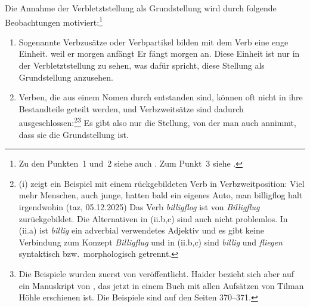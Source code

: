 Die Annahme der Verbletztstellung\label{page-verbletzt} als Grundstellung wird durch folgende Beobachtungen
motiviert:\footnote{
  Zu den Punkten~1 und~2 siehe auch . Zum Punkt~3 siehe .%
}
\begin{enumerate}
\item Sogenannte Verbzusätze oder Verbpartikel bilden mit dem Verb eine enge Einheit.
\eal
\ex weil er morgen anfängt
\ex Er fängt morgen an.
\zl
Diese Einheit ist nur in der Verbletztstellung zu sehen, was dafür spricht, diese
Stellung als Grundstellung anzusehen. 

\item Verben, die aus einem Nomen durch  entstanden sind, können oft nicht
in ihre Bestandteile geteilt werden, und Verbzweitsätze sind dadurch ausgeschlossen:\footnote{%
(i) zeigt ein Beispiel mit einem rückgebildeten Verb in Verbzweitposition:
\ea
Viel mehr Menschen, auch junge, hatten bald ein eigenes Auto, man billigflog halt irgendwohin (taz,
05.12.2025)
\z
Das Verb \emph{billigflog} ist von \emph{Billigflug} zurückgebildet. Die Alternativen in (ii.b,c)
sind auch nicht problemlos.
{
\eal
{}
\zl}
In (ii.a) ist \emph{billig} ein adverbial verwendetes Adjektiv und es gibt keine Verbindung zum
Konzept \emph{Billigflug} und in (ii.b,c) sind \emph{billig} und \emph{fliegen} syntaktisch bzw.\
morphologisch getrennt.
}\footnote{%
Die Beispiele wurden zuerst von \citet[]{Haider93a} veröffentlicht. Haider bezieht sich aber
auf ein Manuskript von \citet{Hoehle91b}, das jetzt in einem Buch mit allen Aufsätzen von Tilman
Höhle erschienen ist. Die Beispiele sind auf den Seiten 370--371.
}
\eal
{}
\zl
Es gibt also nur die Stellung, von der man auch annimmt, dass sie die Grundstellung ist.


\end{enumerate}
